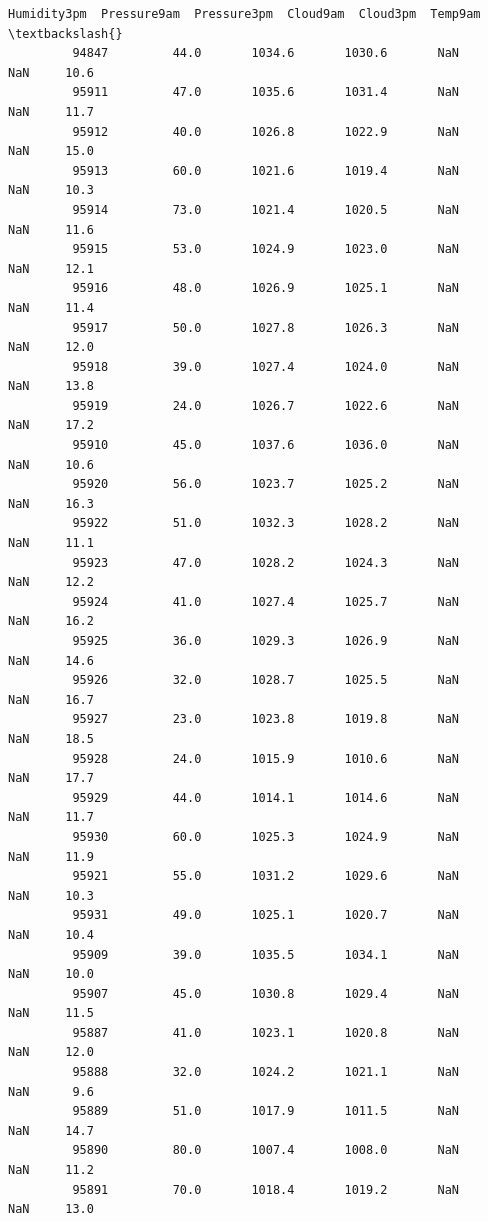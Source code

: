 \documentclass[11pt]{article}
\begin{document}
\begin{Verbatim}[commandchars=\\\{\}]
                Humidity3pm  Pressure9am  Pressure3pm  Cloud9am  Cloud3pm  Temp9am  \textbackslash{}
         94847         44.0       1034.6       1030.6       NaN       NaN     10.6   
         95911         47.0       1035.6       1031.4       NaN       NaN     11.7   
         95912         40.0       1026.8       1022.9       NaN       NaN     15.0   
         95913         60.0       1021.6       1019.4       NaN       NaN     10.3   
         95914         73.0       1021.4       1020.5       NaN       NaN     11.6   
         95915         53.0       1024.9       1023.0       NaN       NaN     12.1   
         95916         48.0       1026.9       1025.1       NaN       NaN     11.4   
         95917         50.0       1027.8       1026.3       NaN       NaN     12.0   
         95918         39.0       1027.4       1024.0       NaN       NaN     13.8   
         95919         24.0       1026.7       1022.6       NaN       NaN     17.2   
         95910         45.0       1037.6       1036.0       NaN       NaN     10.6   
         95920         56.0       1023.7       1025.2       NaN       NaN     16.3   
         95922         51.0       1032.3       1028.2       NaN       NaN     11.1   
         95923         47.0       1028.2       1024.3       NaN       NaN     12.2   
         95924         41.0       1027.4       1025.7       NaN       NaN     16.2   
         95925         36.0       1029.3       1026.9       NaN       NaN     14.6   
         95926         32.0       1028.7       1025.5       NaN       NaN     16.7   
         95927         23.0       1023.8       1019.8       NaN       NaN     18.5   
         95928         24.0       1015.9       1010.6       NaN       NaN     17.7   
         95929         44.0       1014.1       1014.6       NaN       NaN     11.7   
         95930         60.0       1025.3       1024.9       NaN       NaN     11.9   
         95921         55.0       1031.2       1029.6       NaN       NaN     10.3   
         95931         49.0       1025.1       1020.7       NaN       NaN     10.4   
         95909         39.0       1035.5       1034.1       NaN       NaN     10.0   
         95907         45.0       1030.8       1029.4       NaN       NaN     11.5   
         95887         41.0       1023.1       1020.8       NaN       NaN     12.0   
         95888         32.0       1024.2       1021.1       NaN       NaN      9.6   
         95889         51.0       1017.9       1011.5       NaN       NaN     14.7   
         95890         80.0       1007.4       1008.0       NaN       NaN     11.2   
         95891         70.0       1018.4       1019.2       NaN       NaN     13.0   

\end{Verbatim}
\end{document}
